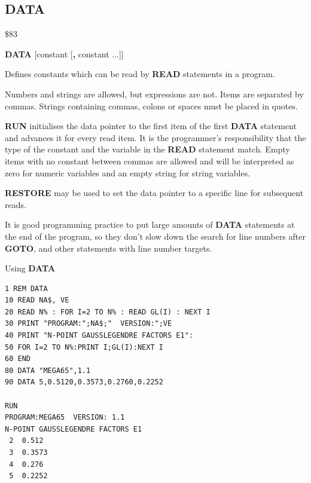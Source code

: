 
\newpage
\subsection{DATA}
\begin{description}[leftmargin=2cm,style=nextline]
\item [Token:] \$83
\item [Format:] {\bf DATA} [constant [{\bf,} constant ...]]
\item [Usage:] Defines constants
               which can be read by {\bf READ} statements
               in a program.

               Numbers and strings are allowed, but expressions are not.
               Items are separated by commas.
               Strings containing commas, colons or spaces must be placed
               in quotes.

               {\bf RUN} initialises the data pointer
               to the first item of the first {\bf DATA} statement
               and advances it for every read item. It is the
               programmer's responsibility that the type of
               the constant and the variable in the {\bf READ}
               statement match. Empty items with no constant
               between commas are allowed and will be interpreted as
               zero for numeric variables and an empty string for
               string variables.

               {\bf RESTORE} may be used to set the
               data pointer to a specific line for subsequent
               reads.

\item [Remarks:] It is good programming practice to put large amounts of
               {\bf DATA} statements at the end of the program,
               so they don't slow down the search for line numbers
               after {\bf GOTO}, and other statements with line number targets.
\item [Example:] Using {\bf DATA}
\begin{tcolorbox}[colback=black,coltext=white]
\verbatimfont{\codefont}
\begin{verbatim}
1 REM DATA
10 READ NA$, VE
20 READ N% : FOR I=2 TO N% : READ GL(I) : NEXT I
30 PRINT "PROGRAM:";NA$;"  VERSION:";VE
40 PRINT "N-POINT GAUSSLEGENDRE FACTORS E1":
50 FOR I=2 TO N%:PRINT I;GL(I):NEXT I
60 END
80 DATA "MEGA65",1.1
90 DATA 5,0.5120,0.3573,0.2760,0.2252

RUN
PROGRAM:MEGA65  VERSION: 1.1
N-POINT GAUSSLEGENDRE FACTORS E1
 2  0.512
 3  0.3573
 4  0.276
 5  0.2252
\end{verbatim}
\end{tcolorbox}
\end{description}

